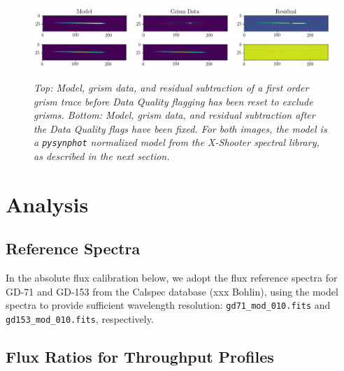 \documentclass[12pt]{article}
\begin{document}
\begin{figure}[h!]
    \includegraphics[width=1\textwidth]{images/ex_mod_res.png}\\
   \includegraphics[width=1\textwidth]{images/better_mod_res.png}
    
\caption{\textit{Top: Model, grism data, and residual subtraction of a first order grism trace before Data Quality flagging 
    has been reset to exclude grisms. Bottom: Model, grism data, and residual subtraction after the Data Quality flags
    have been fixed. For both images, the model is a \texttt{pysynphot} normalized model from the X-Shooter spectral library, 
    as described in the next section.}}
\label{fig:beam_trace}
\end{figure}


\section{Analysis}

\subsection{Reference Spectra}

In the absolute flux calibration below, we adopt the flux reference spectra for GD-71 and GD-153 from the Calspec database (xxx Bohlin), using the model spectra to provide sufficient wavelength resolution: \texttt{gd71\_mod\_010.fits} and \texttt{gd153\_mod\_010.fits}, respectively.

\subsection{Flux Ratios for Throughput Profiles}
\end{document}
